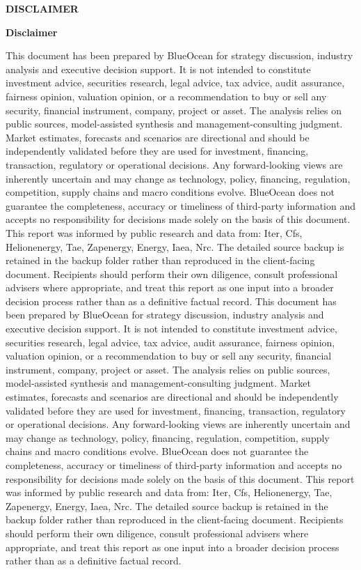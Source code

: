 \documentclass[10pt,a4paper]{article}
\begin{document}
\clearpage
{\textcolor{BOBlue}{\scriptsize\bfseries DISCLAIMER}}\par\vspace{3pt}
{\Large\sffamily\bfseries\color{BONavy} Disclaimer}\par\vspace{4pt}
\vspace{2pt}{\color{BOBright}\rule{\linewidth}{1pt}}\vspace{5pt}
{\footnotesize\color{BOMuted} This document has been prepared by BlueOcean for strategy discussion, industry analysis and executive decision support. It is not intended to constitute investment advice, securities research, legal advice, tax advice, audit assurance, fairness opinion, valuation opinion, or a recommendation to buy or sell any security, financial instrument, company, project or asset. The analysis relies on public sources, model-assisted synthesis and management-consulting judgment. Market estimates, forecasts and scenarios are directional and should be independently validated before they are used for investment, financing, transaction, regulatory or operational decisions. Any forward-looking views are inherently uncertain and may change as technology, policy, financing, regulation, competition, supply chains and macro conditions evolve. BlueOcean does not guarantee the completeness, accuracy or timeliness of third-party information and accepts no responsibility for decisions made solely on the basis of this document. This report was informed by public research and data from: Iter, Cfs, Helionenergy, Tae, Zapenergy, Energy, Iaea, Nrc. The detailed source backup is retained in the backup folder rather than reproduced in the client-facing document. Recipients should perform their own diligence, consult professional advisers where appropriate, and treat this report as one input into a broader decision process rather than as a definitive factual record. This document has been prepared by BlueOcean for strategy discussion, industry analysis and executive decision support. It is not intended to constitute investment advice, securities research, legal advice, tax advice, audit assurance, fairness opinion, valuation opinion, or a recommendation to buy or sell any security, financial instrument, company, project or asset. The analysis relies on public sources, model-assisted synthesis and management-consulting judgment. Market estimates, forecasts and scenarios are directional and should be independently validated before they are used for investment, financing, transaction, regulatory or operational decisions. Any forward-looking views are inherently uncertain and may change as technology, policy, financing, regulation, competition, supply chains and macro conditions evolve. BlueOcean does not guarantee the completeness, accuracy or timeliness of third-party information and accepts no responsibility for decisions made solely on the basis of this document. This report was informed by public research and data from: Iter, Cfs, Helionenergy, Tae, Zapenergy, Energy, Iaea, Nrc. The detailed source backup is retained in the backup folder rather than reproduced in the client-facing document. Recipients should perform their own diligence, consult professional advisers where appropriate, and treat this report as one input into a broader decision process rather than as a definitive factual record.}
\end{document}

